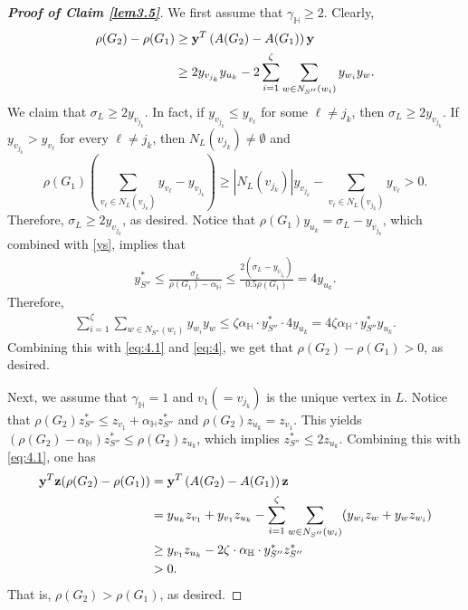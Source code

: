 \documentclass[10pt,a4paper]{amsart}
\begin{document}
\begin{proof}[\bf Proof of Claim \ref{lem3.5}]
    We first assume that $\gamma_\mathbb{H}\geq2$. Clearly, 
    \begin{align}\notag\label{eq:4}
        \rho(G_2)-\rho(G_1)&\geq{\bf y}^T\left(A(G_2)-A(G_1)\right){\bf y}\\&\geq 2y_{v_{j_k}}y_{u_k}-2\sum_{i=1}^{\zeta}\sum_{w\in N_{S''}(w_i)}y_{w_i}y_w.
    \end{align}
We claim that $\sigma_L\geq 2y_{v_{j_k}}$. In fact, if $y_{v_{j_k}}\leq y_{v_{\ell}}$ for some $\ell\neq j_k$, then $\sigma_L\geq 2y_{v_{j_k}}$. If $y_{v_{j_k}}> y_{v_{\ell}}$ for every  $\ell\neq j_k$, then $N_L(v_{j_k})\neq \emptyset$ and  
$$
\rho(G_1)\left(\sum_{v_\ell\in N_L(v_{j_k})}y_{v_\ell}-y_{v_{j_k}}\right)\geq |N_L(v_{j_k})|y_{v_{j_k}}-\sum_{v_\ell\in N_L(v_{j_k})}y_{v_\ell}>0.
$$
Therefore, $\sigma_L\geq 2y_{v_{j_k}}$, as desired. 
Notice that $\rho(G_1)y_{u_k}=\sigma_L-y_{v_{j_k}}$, %
which combined with \eqref{ys}, implies that  
\begin{align*}
y_{S''}^*\leq\frac{\sigma_L}{\rho(G_1)-\alpha_\mathbb{H}}\leq\frac{2(\sigma_L-y_{v_{j_k}})}{0.5\rho(G_1)}=4y_{u_k}.
\end{align*}
   Therefore, %
    \begin{align*}
        \sum_{i=1}^{\zeta}\sum_{w\in N_{S''}(w_i)}y_{w_i}y_w\leq\zeta\alpha_\mathbb{H}\cdot y_{S''}^*\cdot4y_{u_k}=4\zeta\alpha_\mathbb{H}\cdot y_{S''}^*y_{u_k}.
    \end{align*}
Combining this with \eqref{eq:4.1} and \eqref{eq:4}, we get that $\rho(G_2)-\rho(G_1)>0$, as desired. 
    
    Next, we assume that $\gamma_\mathbb{H}=1$ and $v_1 (=v_{j_k})$ is the unique vertex in $L$.
    Notice that $\rho(G_2)z_{S''}^*\leq z_{v_1}+\alpha_\mathbb{H}z_{S''}^*$ %
    and $\rho(G_2)z_{u_k}=z_{v_1}$. 
    This yields $(\rho(G_2)-\alpha_\mathbb{H})z_{S''}^*\leq \rho(G_2)z_{u_k}$, %
    which implies $z_{S''}^*\leq 2z_{u_k}$. Combining this with \eqref{eq:4.1}, one has 
    \begin{align*}
        {\bf y}^T{\bf z}(\rho(G_2)-\rho(G_1))&={\bf y}^T\left(A(G_2)-A(G_1)\right){\bf z}\\
        &=y_{u_k}z_{v_1}+y_{v_1}z_{u_k}-\sum_{i=1}^{\zeta}\sum_{w\in N_{S''}(w_i)}(y_{w_i}z_w+y_wz_{w_i})\\&\geq y_{v_1}z_{u_k}-2\zeta\cdot\alpha_\mathbb{H}\cdot y_{S''}^*z_{S''}^*\\&>0.%
    \end{align*}
That is, $\rho(G_2)>\rho(G_1)$, as desired. 


\end{proof}
\end{document}

